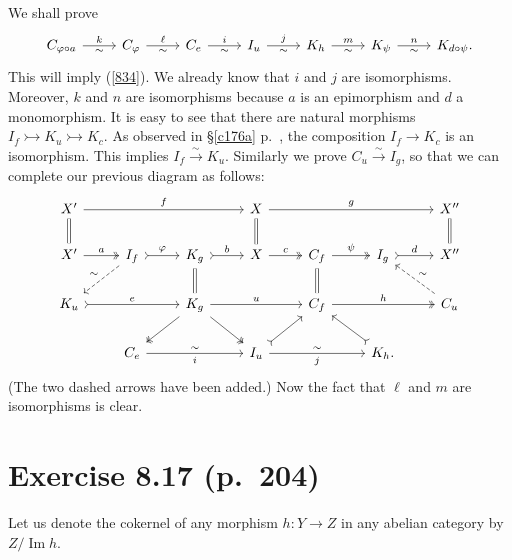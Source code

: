 \documentclass[12pt]{article}
\theoremstyle{remark}
\theoremstyle{definition}
\newcommand{\mono}{\rightarrowtail}%
\newcommand{\xr}{\xrightarrow}
\DeclareMathOperator{\Ima}{Im}
\begin{document}
We shall prove 
$$
\begin{tikzcd}
C_{\varphi\circ a}\ar{r}{k}[swap]{\sim}&C_\varphi\ar{r}{\ell}[swap]{\sim}&C_e\ar{r}{i}[swap]{\sim}&I_u\ar{r}{j}[swap]{\sim}&K_h\ar{r}{m}[swap]{\sim}&K_\psi\ar{r}{n}[swap]{\sim}&K_{d\circ\psi}.
\end{tikzcd}
$$
This will imply (\ref{834}). We already know that $i$ and $j$ are isomorphisms. Moreover, $k$ and $n$ are isomorphisms because $a$ is an epimorphism and $d$ a monomorphism. It is easy to see that there are natural morphisms $I_f\mono K_u\mono K_c$. As observed in \S\ref{c176a} p.~\pageref{c176a}, the composition $I_f\to K_c$ is an isomorphism. This implies $I_f\xr\sim K_u$. Similarly we prove $C_u\xr\sim I_g$, so that we can complete our previous diagram as follows: 
$$
\begin{tikzcd}
X'\ar{rrr}{f}\ar[equal]{d}&&&X\ar[equal]{d}\ar{rrr}{g}&&&X''\ar[equal]{d}\\ 
X'\ar[two heads]{r}{a}&I_f\ar[dashed]{dl}[swap]{\sim}\ar[tail]{r}{\varphi}&K_g\ar[equal]{d}\ar[tail]{r}{b}&X\ar[two heads]{r}{c}&C_f\ar[equal]{d}\ar[two heads]{r}{\psi}&I_g\ar[tail]{r}{d}&X''\\ 
K_u\ar[tail]{rr}{e}&&K_g\ar[two heads]{dl}\ar[two heads]{dr}\ar{rr}{u}&&C_f\ar[two heads]{rr}{h}&&C_u\ar[dashed]{ul}[swap]{\sim}\\ 
&C_e\ar{rr}{\sim}[swap]{i}&&I_u\ar[tail]{ur}\ar{rr}{\sim}[swap]{j}&&K_h.\ar[tail]{ul}
\end{tikzcd}
$$ 
(The two dashed arrows have been added.) Now the fact that $\ell$ and $m$ are isomorphisms is clear. 
%
\section{Exercise 8.17 (p.~204)}\label{817} 
%
Let us denote the cokernel of any morphism $h:Y\to Z$ in any abelian category by $Z/\Ima h$. 
\end{document}
